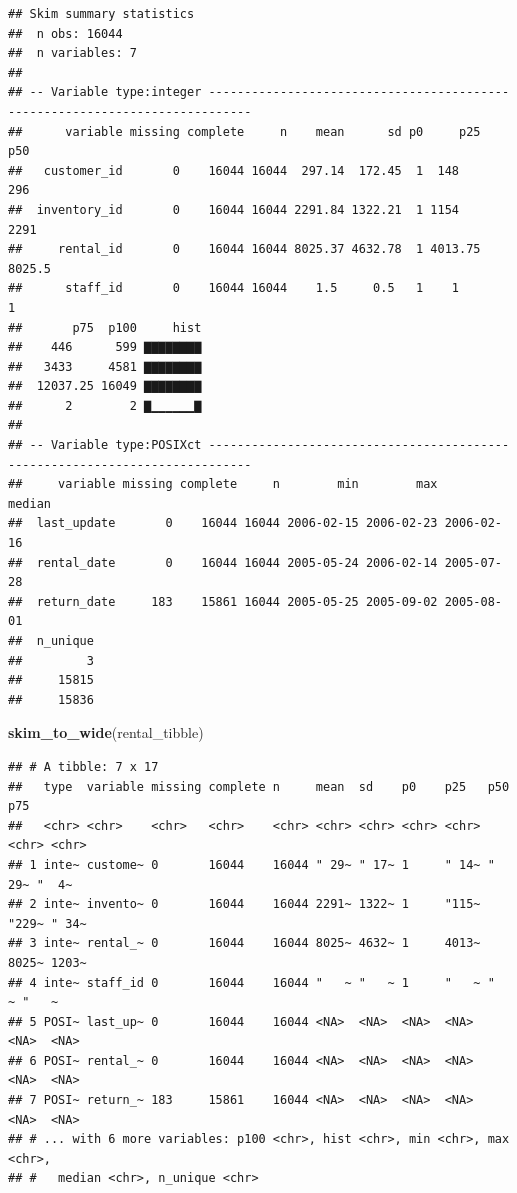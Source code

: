 \documentclass[]{book}
\newenvironment{Shaded}{\begin{snugshade}}{\end{snugshade}}
\newcommand{\KeywordTok}[1]{\textcolor[rgb]{0.13,0.29,0.53}{\textbf{#1}}}
\newcommand{\NormalTok}[1]{#1}
\theoremstyle{definition}
\theoremstyle{definition}
\theoremstyle{definition}
\theoremstyle{remark}
\begin{document}
\begin{verbatim}
## Skim summary statistics
##  n obs: 16044 
##  n variables: 7 
## 
## -- Variable type:integer ----------------------------------------------------------------------------
##      variable missing complete     n    mean      sd p0     p25    p50
##   customer_id       0    16044 16044  297.14  172.45  1  148     296  
##  inventory_id       0    16044 16044 2291.84 1322.21  1 1154    2291  
##     rental_id       0    16044 16044 8025.37 4632.78  1 4013.75 8025.5
##      staff_id       0    16044 16044    1.5     0.5   1    1       1  
##       p75  p100     hist
##    446      599 ▇▇▇▇▇▇▇▇
##   3433     4581 ▇▇▇▇▇▇▇▇
##  12037.25 16049 ▇▇▇▇▇▇▇▇
##      2        2 ▇▁▁▁▁▁▁▇
## 
## -- Variable type:POSIXct ----------------------------------------------------------------------------
##     variable missing complete     n        min        max     median
##  last_update       0    16044 16044 2006-02-15 2006-02-23 2006-02-16
##  rental_date       0    16044 16044 2005-05-24 2006-02-14 2005-07-28
##  return_date     183    15861 16044 2005-05-25 2005-09-02 2005-08-01
##  n_unique
##         3
##     15815
##     15836
\end{verbatim}

\begin{Shaded}
\begin{Highlighting}[]
\KeywordTok{skim_to_wide}\NormalTok{(rental_tibble)}
\end{Highlighting}
\end{Shaded}

\begin{verbatim}
## # A tibble: 7 x 17
##   type  variable missing complete n     mean  sd    p0    p25   p50   p75  
##   <chr> <chr>    <chr>   <chr>    <chr> <chr> <chr> <chr> <chr> <chr> <chr>
## 1 inte~ custome~ 0       16044    16044 " 29~ " 17~ 1     " 14~ " 29~ "  4~
## 2 inte~ invento~ 0       16044    16044 2291~ 1322~ 1     "115~ "229~ " 34~
## 3 inte~ rental_~ 0       16044    16044 8025~ 4632~ 1     4013~ 8025~ 1203~
## 4 inte~ staff_id 0       16044    16044 "   ~ "   ~ 1     "   ~ "   ~ "   ~
## 5 POSI~ last_up~ 0       16044    16044 <NA>  <NA>  <NA>  <NA>  <NA>  <NA> 
## 6 POSI~ rental_~ 0       16044    16044 <NA>  <NA>  <NA>  <NA>  <NA>  <NA> 
## 7 POSI~ return_~ 183     15861    16044 <NA>  <NA>  <NA>  <NA>  <NA>  <NA> 
## # ... with 6 more variables: p100 <chr>, hist <chr>, min <chr>, max <chr>,
## #   median <chr>, n_unique <chr>
\end{verbatim}
\end{document}
